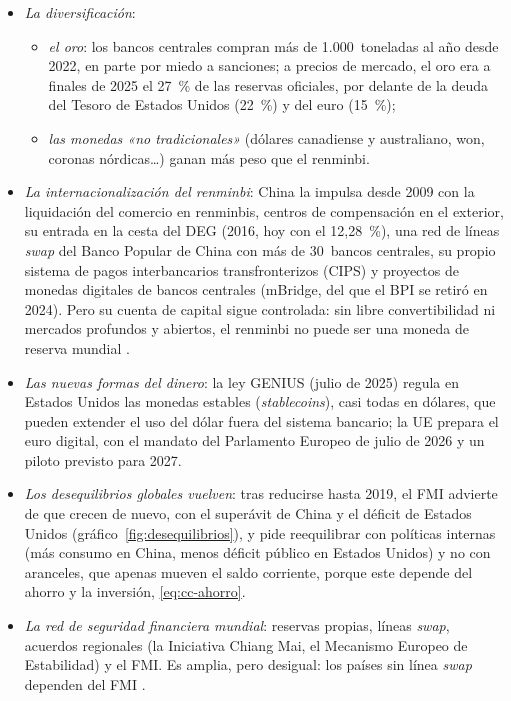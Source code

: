\documentclass[11pt]{article}
\begin{document}
\begin{itemize}
\item \emph{La diversificación}:
  \begin{itemize}
  \item \emph{el oro}: los bancos centrales compran más de 1.000~toneladas al año desde 2022, en parte por miedo a sanciones; a precios de mercado, el oro era a finales de 2025 el 27~\% de las reservas oficiales, por delante de la deuda del Tesoro de Estados Unidos (22~\%) y del euro (15~\%)\nocite{BCE2026PapelEuro};
  \item \emph{las monedas «no tradicionales»} (dólares canadiense y australiano, won, coronas nórdicas…) ganan más peso que el renminbi.
  \end{itemize}
\item \emph{La internacionalización del renminbi}: China la impulsa desde 2009 con la liquidación del comercio en renminbis, centros de compensación en el exterior, su entrada en la cesta del DEG (2016, hoy con el 12,28~\%), una red de líneas \emph{swap} del Banco Popular de China con más de 30~bancos centrales, su propio sistema de pagos interbancarios transfronterizos (CIPS) y proyectos de monedas digitales de bancos centrales (mBridge, del que el BPI se retiró en 2024). Pero su cuenta de capital sigue controlada: sin libre convertibilidad ni mercados profundos y abiertos, el renminbi no puede ser una moneda de reserva mundial\nocite{Wei2023Renminbi} .
\item \emph{Las nuevas formas del dinero}: la ley GENIUS (julio de 2025) regula en Estados Unidos las monedas estables (\emph{stablecoins}), casi todas en dólares, que pueden extender el uso del dólar fuera del sistema bancario\nocite{Congreso2025GENIUS}; la UE prepara el euro digital, con el mandato del Parlamento Europeo de julio de 2026 y un piloto previsto para 2027\nocite{BCE2026EuroDigital}.
\item \emph{Los desequilibrios globales vuelven}: tras reducirse hasta 2019, el FMI advierte de que crecen de nuevo, con el superávit de China y el déficit de Estados Unidos (gráfico~\ref{fig:desequilibrios}), y pide reequilibrar con políticas internas (más consumo en China, menos déficit público en Estados Unidos) y no con aranceles, que apenas mueven el saldo corriente, porque este depende del ahorro y la inversión, \eqref{eq:cc-ahorro}\nocite{FMI2026ESR}.
\item \emph{La red de seguridad financiera mundial}: reservas propias, líneas \emph{swap}, acuerdos regionales (la Iniciativa Chiang Mai, el Mecanismo Europeo de Estabilidad) y el FMI. Es amplia, pero desigual: los países sin línea \emph{swap} dependen del FMI .
\end{itemize}
\end{document}
